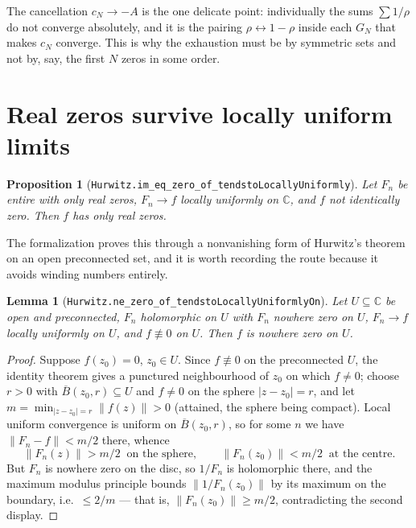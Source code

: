 \documentclass[11pt]{article}
\newtheorem{proposition}[theorem]{Proposition}
\newtheorem{lemma}[theorem]{Lemma}
\theoremstyle{definition}
\begin{document}
The cancellation $c_N\to-A$ is the one delicate point: individually the sums $\sum1/\rho$ do not
converge absolutely, and it is the pairing $\rho\leftrightarrow1-\rho$ inside each $G_N$ that makes
$c_N$ converge.  This is why the exhaustion must be by symmetric sets and not by, say, the first $N$
zeros in some order.

\section{Real zeros survive locally uniform limits}\label{sec:hurwitz}

\begin{proposition}[\texttt{Hurwitz.im\_eq\_zero\_of\_tendstoLocallyUniformly}]\label{prop:hurwitz}
Let $F_n$ be entire with only real zeros, $F_n\to f$ locally uniformly on $\mathbb C$, and $f$ not
identically zero.  Then $f$ has only real zeros.
\end{proposition}

The formalization proves this through a nonvanishing form of Hurwitz's theorem on an open preconnected
set, and it is worth recording the route because it avoids winding numbers entirely.

\begin{lemma}[\texttt{Hurwitz.ne\_zero\_of\_tendstoLocallyUniformlyOn}]\label{lem:hurwitz}
Let $U\subseteq\mathbb C$ be open and preconnected, $F_n$ holomorphic on $U$ with $F_n$ nowhere zero on
$U$, $F_n\to f$ locally uniformly on $U$, and $f\not\equiv0$ on $U$.  Then $f$ is nowhere zero on $U$.
\end{lemma}

\begin{proof}
Suppose $f(z_0)=0$, $z_0\in U$.  Since $f\not\equiv0$ on the preconnected $U$, the identity theorem
gives a punctured neighbourhood of $z_0$ on which $f\ne0$; choose $r>0$ with
$\overline{B}(z_0,r)\subseteq U$ and $f\ne0$ on the sphere $|z-z_0|=r$, and let
$m=\min_{|z-z_0|=r}\|f(z)\|>0$ (attained, the sphere being compact).  Local uniform convergence is
uniform on $\overline{B}(z_0,r)$, so for some $n$ we have $\|F_n-f\|<m/2$ there, whence
\[
  \|F_n(z)\|>m/2 \ \text{ on the sphere},\qquad \|F_n(z_0)\|<m/2 \ \text{ at the centre}.
\]
But $F_n$ is nowhere zero on the disc, so $1/F_n$ is holomorphic there, and the maximum modulus
principle bounds $\|1/F_n(z_0)\|$ by its maximum on the boundary, i.e.\ $\le2/m$ --- that is,
$\|F_n(z_0)\|\ge m/2$, contradicting the second display.
\end{proof}
\end{document}
